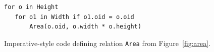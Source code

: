 \begin{figure}[t]
  \footnotesize
  \begin{lstlisting}[language=ddlog]
for o in Height
   for o1 in Width if o1.oid = o.oid
       Area(o.oid, o.width * o.height)
  \end{lstlisting}
  \caption{Imperative-style code defining relation \texttt{Area} from
    Figure~\ref{fig:area}.
    \label{fig:imperative}}
\end{figure}
